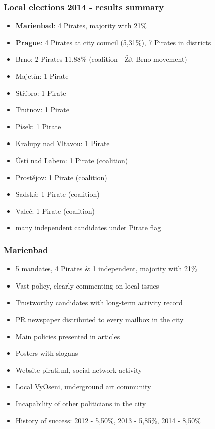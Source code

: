 \begin{frame}
	\frametitle{Local elections 2014 - results summary}
	\begin{itemize}
	\item \textbf{Marienbad}: 4 Pirates, majority with 21\%
	\item \textbf{Prague}: 4 Pirates at city council (5,31\%), 7 Pirates in districts
	\item Brno: 2 Pirates 11,88\% (coalition - \v{Z}\'it Brno movement)
	\item Majet\'in: 1 Pirate
	\item St\v{r}\'ibro: 1 Pirate
	\item Trutnov: 1 Pirate
	\item P\'isek: 1 Pirate
	\item Kralupy nad Vltavou: 1 Pirate
	\item \'Ust\'i nad Labem: 1 Pirate (coalition)
	\item Prost\v{e}jov: 1 Pirate (coalition)
	\item Sadsk\'a: 1 Pirate (coalition)
	\item Vale\v{c}: 1 Pirate (coalition)
	\item many independent candidates under Pirate flag
\end{itemize}
\end{frame}
\begin{frame}
	\frametitle{Marienbad}
	\begin{itemize}
	\item 5 mandates, 4 Pirates \& 1 independent, majority with 21\%
	\item Vast policy, clearly commenting on local issues
	\item Trustworthy candidates with long-term activity record
	\item PR newspaper distributed to every mailbox in the city
	\item Main policies presented in articles
	\item Posters with slogans
	\item Website pirati.ml, social network activity
	\item Local VyOseni, underground art community
	\item Incapability of other politicians in the city
	\item History of success: 2012 - 5,50\%, 2013 - 5,85\%, 2014 - 8,50\%
	\end{itemize}
\end{frame}
